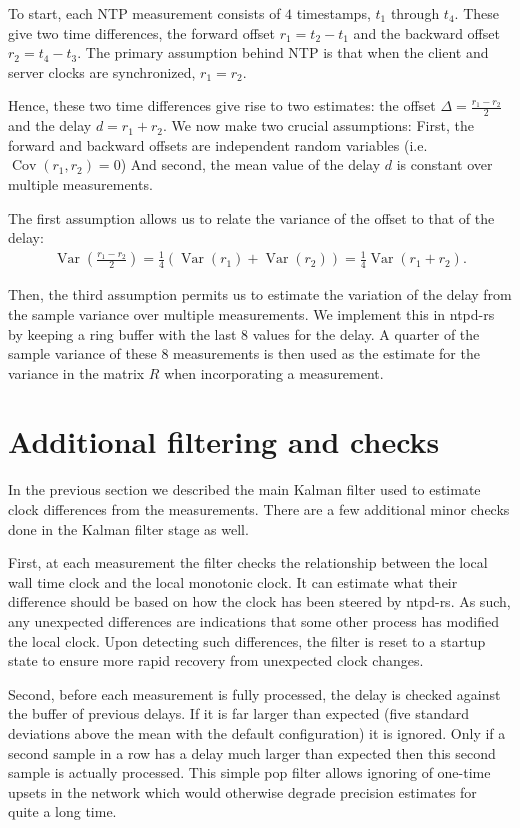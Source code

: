 \documentclass{article}
\DeclareMathOperator{\Var}{Var}
\DeclareMathOperator{\Cov}{Cov}
\begin{document}
To start, each NTP measurement consists of $4$ timestamps, $t_1$ through $t_4$.
These give two time differences, the forward offset $r_1 = t_2 - t_1$ and the backward offset $r_2 = t_4 - t_3$.
The primary assumption behind NTP is that when the client and server clocks are synchronized, $r_1 = r_2$.

Hence, these two time differences give rise to two estimates: the offset $\Delta = \frac{r_1 - r_2}{2}$ and the delay $d = r_1 + r_2$.
We now make two crucial assumptions: 
First, the forward and backward offsets are independent random variables (i.e. $\Cov(r_1, r_2) = 0$)
And second, the mean value of the delay $d$ is constant over multiple measurements.

The first assumption allows us to relate the variance of the offset to that of the delay:
\begin{align}
\Var\left(\frac{r_1-r_2}{2}\right) = \frac{1}{4}\left(\Var(r_1) + \Var(r_2)\right) = \frac{1}{4}\Var(r_1+r_2).
\end{align}

Then, the third assumption permits us to estimate the variation of the delay from the sample variance over multiple measurements.
We implement this in ntpd-rs by keeping a ring buffer with the last 8 values for the delay.
A quarter of the sample variance of these 8 measurements is then used as the estimate for the variance in the matrix $R$ when incorporating a measurement.

\section{Additional filtering and checks}\label{sec:additionalchecks}

In the previous section we described the main Kalman filter used to estimate clock differences from the measurements.
There are a few additional minor checks done in the Kalman filter stage as well.

First, at each measurement the filter checks the relationship between the local wall time clock and the local monotonic clock.
It can estimate what their difference should be based on how the clock has been steered by ntpd-rs.
As such, any unexpected differences are indications that some other process has modified the local clock.
Upon detecting such differences, the filter is reset to a startup state to ensure more rapid recovery from unexpected clock changes.

Second, before each measurement is fully processed, the delay is checked against the buffer of previous delays.
If it is far larger than expected (five standard deviations above the mean with the default configuration) it is ignored.
Only if a second sample in a row has a delay much larger than expected then this second sample is actually processed.
This simple pop filter allows ignoring of one-time upsets in the network which would otherwise degrade precision estimates for quite a long time.
\end{document}
